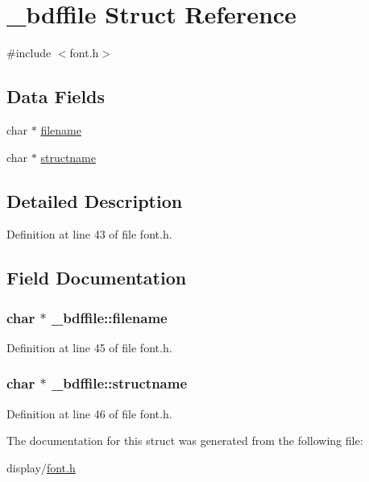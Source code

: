 \hypertarget{struct__bdffile}{\section{\-\_\-bdffile Struct Reference}
\label{struct__bdffile}
}


{\ttfamily \#include $<$font.\-h$>$}

\subsection*{Data Fields}
\begin{DoxyCompactItemize}
\item 
char $\ast$ \hyperlink{struct__bdffile_a040674bb1df0a8d4b1bedeae616e9b65}{filename}
\item 
char $\ast$ \hyperlink{struct__bdffile_a54e6c69f33cc656848ad924faba85b53}{structname}
\end{DoxyCompactItemize}


\subsection{Detailed Description}


Definition at line 43 of file font.\-h.



\subsection{Field Documentation}
\hypertarget{struct__bdffile_a040674bb1df0a8d4b1bedeae616e9b65}{
\subsubsection[{filename}]{\setlength{\rightskip}{0pt plus 5cm}char $\ast$ \-\_\-bdffile\-::filename}}\label{struct__bdffile_a040674bb1df0a8d4b1bedeae616e9b65}


Definition at line 45 of file font.\-h.

\hypertarget{struct__bdffile_a54e6c69f33cc656848ad924faba85b53}{
\subsubsection[{structname}]{\setlength{\rightskip}{0pt plus 5cm}char $\ast$ \-\_\-bdffile\-::structname}}\label{struct__bdffile_a54e6c69f33cc656848ad924faba85b53}


Definition at line 46 of file font.\-h.



The documentation for this struct was generated from the following file\-:\begin{DoxyCompactItemize}
\item 
display/\hyperlink{display_2font_8h}{font.\-h}\end{DoxyCompactItemize}
